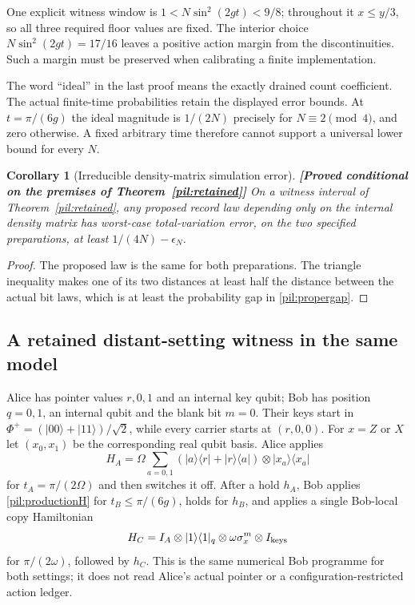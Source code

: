 \documentclass[11pt,a4paper]{article}
\newtheorem{corollary}[theorem]{Corollary}
\theoremstyle{definition}
\theoremstyle{remark}\newtheorem{remark}[theorem]{Remark}
\newcommand{\status}[1]{\textbf{[#1]}\quad}
\begin{document}
One explicit witness window is $1<N\sin^2(2gt)<9/8$; throughout it $x\le y/3$, so all three required floor values are fixed. The interior choice $N\sin^2(2gt)=17/16$ leaves a positive action margin from the discontinuities. Such a margin must be preserved when calibrating a finite implementation.

The word ``ideal'' in the last proof means the exactly drained count coefficient. The actual finite-time probabilities retain the displayed error bounds. At $t=\pi/(6g)$ the ideal magnitude is $1/(2N)$ precisely for $N\equiv2\pmod4$, and zero otherwise. A fixed arbitrary time therefore cannot support a universal lower bound for every $N$.

\begin{corollary}[Irreducible density-matrix simulation error]\label{pil:simulator}
\status{Proved conditional on the premises of Theorem~\ref{pil:retained}}
On a witness interval of Theorem~\ref{pil:retained}, any proposed record law depending only on the internal density matrix has worst-case total-variation error, on the two specified preparations, at least $1/(4N)-\epsilon_N$.
\end{corollary}
\begin{proof}
The proposed law is the same for both preparations. The triangle inequality makes one of its two distances at least half the distance between the actual bit laws, which is at least the probability gap in \eqref{pil:propergap}.
\end{proof}

\subsection{A retained distant-setting witness in the same model}

Alice has pointer values $r,0,1$ and an internal key qubit; Bob has position $q=0,1$, an internal qubit and the blank bit $m=0$. Their keys start in $\Phi^+=(|00\rangle+|11\rangle)/\sqrt2$, while every carrier starts at $(r,0,0)$. For $x=Z$ or $X$ let $(x_0,x_1)$ be the corresponding real qubit basis. Alice applies
\begin{equation}\label{pil:AliceH}
 H_A=\Omega\sum_{a=0,1}(|a\rangle\langle r|+|r\rangle\langle a|)
                  \otimes|x_a\rangle\langle x_a|
\end{equation}
for $t_A=\pi/(2\Omega)$ and then switches it off. After a hold $h_A$, Bob applies \eqref{pil:productionH} for $t_B\le\pi/(6g)$, holds for $h_B$, and applies a single Bob-local copy Hamiltonian
\begin{equation}\label{pil:Bobcopy}
 H_C=I_A\otimes |1\rangle\langle1|_{q}
                \otimes\omega\sigma_x^{m}\otimes I_{\rm keys}
\end{equation}
for $\pi/(2\omega)$, followed by $h_C$. This is the same numerical Bob programme for both settings; it does not read Alice's actual pointer or a configuration-restricted action ledger.
\end{document}
